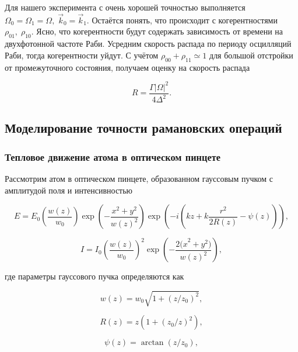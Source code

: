 Для нашего эксперимента с очень хорошей точностью выполняется $\Omega_0=\Omega_1=\Omega,\; \vec{k}_0=\vec{k}_1$. Остаётся понять, что происходит с когерентностями $\rho_{01},\; \rho_{10}$. Ясно, что когерентности будут содержать зависимость от времени на двухфотонной частоте Раби. Усредним скорость распада по периоду осцилляций Раби, тогда когерентности уйдут. С учётом $\rho_{00}+\rho_{11}\simeq 1$ для большой отстройки от промежуточного состояния, получаем оценку на скорость распада

\begin{equation}
	R=\frac{\Gamma|\Omega|^2}{4\Delta^2}.
	\label{eq:decay_rate}
\end{equation}



\subsection{Моделирование точности рамановских операций}

\subsubsection{Тепловое движение атома в оптическом пинцете}

Рассмотрим атом в оптическом пинцете, образованном гауссовым пучком с амплитудой поля и интенсивностью

\begin{equation}
	E=E_0\left(\frac{w\left(z\right)}{w_0}\right)\exp\left(-\frac{x^2+y^2}{w\left(z\right)^2}\right)\exp{\left(-i\left(kz+k\frac{r^2}{2R\left(z\right)}-\psi\left(z\right)\right)\right)},    
\end{equation}

\begin{equation}
	I=I_0\left(\frac{w\left(z\right)}{w_0}\right)^2\exp\left(-\frac{{2(x}^2+y^2)}{w\left(z\right)^2}\right),
\end{equation}

где параметры гауссового пучка определяются как

\begin{equation}
	w\left(z\right)=w_0\sqrt{1+\left(z/z_0\right)^2},
\end{equation}

\begin{equation}
	R\left(z\right)=z\left(1+\left(z_0/z\right)^2\right),
\end{equation}

\begin{equation}
	\psi\left(z\right)=\arctan\left(z/z_0\right),
\end{equation}

